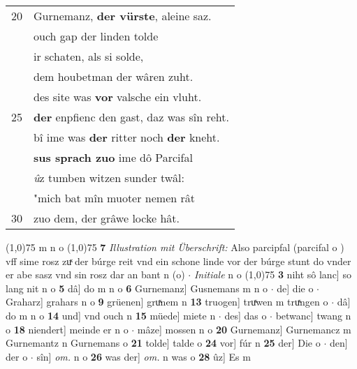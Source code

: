 \documentclass[8pt,a4paper,notitlepage]{article}
\begin{document}
\begin{table}[ht]
\begin{minipage}[t]{0.5\linewidth}
\begin{tabular}{rl}
20 & Gurnemanz, \textbf{der vürste}, aleine saz.\\ 
 & ouch gap der linden tolde\\ 
 & ir schaten, als si solde,\\ 
 & dem houbetman der wâren zuht.\\ 
 & des site was \textbf{vor} valsche ein vluht.\\ 
25 & \textbf{der} enpfienc den gast, daz was sîn reht.\\ 
 & bî ime was \textbf{der} ritter noch \textbf{der} kneht.\\ 
 & \textbf{sus sprach zuo} ime dô Parcifal\\ 
 & \textit{û}z tumben witzen sunder twâl:\\ 
 & "mich bat mîn muoter nemen rât\\ 
30 & zuo dem, der grâwe locke hât.\\ 
\end{tabular}
\scriptsize
\line(1,0){75} \newline
m n o \newline
\line(1,0){75} \newline
\textbf{7} \textit{Illustration mit Überschrift:} Also parcipfal (parcifal o  ) vff sime rosz zuͯ der búrge reit vnd ein schone linde vor der búrge stunt do vnder er abe sasz vnd sin rosz dar an bant n (o)   $\cdot$ \textit{Initiale} n o  \newline
\line(1,0){75} \newline
\textbf{3} niht sô lanc] so lang nit n o \textbf{5} dâ] do m n o \textbf{6} Gurnemanz] Gusnemans m n o  $\cdot$ de] die o  $\cdot$ Graharz] grahars n o \textbf{9} grüenen] gruͯnem n \textbf{13} truogen] truͯwen m truͯngen o  $\cdot$ dâ] do m n o \textbf{14} und] vnd ouch n \textbf{15} müede] miete n  $\cdot$ des] das o  $\cdot$ betwanc] twang n o \textbf{18} niendert] meinde er n o  $\cdot$ mâze] mossen n o \textbf{20} Gurnemanz] Gurnemancz m Gurnemantz n Gurnemans o \textbf{21} tolde] talde o \textbf{24} vor] fúr n \textbf{25} der] Die o  $\cdot$ den] der o  $\cdot$ sîn] \textit{om.} n o \textbf{26} was der] \textit{om.} n was o \textbf{28} ûz] Es m \newline
\end{minipage}
\end{table}
\newpage
\end{document}
